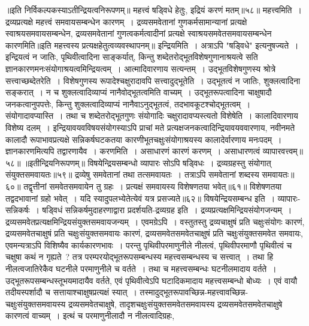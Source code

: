 ॥इति निर्विकल्पकस्याऽतीन्द्रियत्वनिरूपणम्॥
महत्त्वं षड्विधे हेतुः, इद्रियं करणं मतम्॥५८॥
महत्त्वमिति~। द्रव्यप्रत्यक्षे महत्त्वं समवायसम्बन्धेन कारणम्~। द्रव्यसमवेतानां गुणकर्मसामान्यानां प्रत्यक्षे स्वाश्रयसमवायसम्बन्धेन, द्रव्यसमवेतानां गुणत्वकर्मत्वादीनां
प्रत्यक्षे स्वाश्रयसमवेतसमवायसम्बन्धेन कारणमिति॥इति महत्त्वस्य प्रत्यक्षहेतुत्वव्यवस्थापनम्॥
इन्द्रियमिति~। अत्राऽपि "षड्विधे" इत्यनुषज्यते~। इन्द्रियत्वं न जातिः, पृथिवीत्वादिना साङ्कर्यात्, किन्तु शब्देतरोद्भूतविशेषगुणानाश्रयत्वे सति
ज्ञानकारणमनःसंयोगाश्रयत्वमिन्द्रियत्वम्~। आत्मादिवारणाय सत्यन्तम्~। उद्भूतविशेषगुणस्य श्रोत्रे सत्त्वाच्छब्देतरेति~। विशेषगुणस्य रूपादेश्चक्षुरादावपि सत्त्वादुद्भूतेति~।
उद्भूतत्वं न जातिः, शुक्लत्वादिना सङ्करात्~। न च शुक्लत्वादिव्याप्यं नानैवोद्भूतत्वमिति वाच्यम्~। उद्भूतरूपत्वादिना चाक्षुषादौ जनकत्वानुपपत्तेः, किन्तु शुक्लत्वादिव्याप्यं
नानैवाऽनुद्भूतत्वं, तदभावकूटश्चोद्भूतत्वम्~। संयोगादावप्यास्ति~। तथा च शब्देतरोद्भूतगुणः संयोगादिः चक्षुरादावप्यस्त्यतो विशेषेति~। कालादिवारणाय विशेष्य दलम्~।
इन्द्रियावयवविषयसंयोगस्याऽपि प्राचां मते प्रत्यक्षजनकत्वादिन्द्रियावयववारणाय, नवीनमते कालादौ रूपाभावप्रत्यक्षे सन्निकर्षघटकतया कारणीभूतचक्षुःसंयोगाश्रयस्य
कालादेर्वारणाय मनःपदम्~। ज्ञानकारणमित्यपि तद्वारणायैव~। करणमिति~। असाधारणं कारणं करणम्~। असाधारणत्वं व्यापारवत्त्वम्॥५८॥
॥इतीन्द्रियनिरूपणम्॥
विषयेन्द्रियसम्बन्धो व्यापारः सोऽपि षड्विधः~।
द्रव्यग्रहस्तु संयोगात् संयुक्तसमवायतः॥५९॥
द्रव्येषु समवेतानां तथा तत्समवायतः~।
तत्राऽपि समवेतानां शब्दस्य समवायतः॥६०॥
तद्वृत्तीनां समवेतसमवायेन तु ग्रहः~।
प्रत्यक्षं समवायस्य विशेषणतया भवेत्॥६१॥
विशेषणतया तद्वदभावानां ग्रहो भवेत्~।
यदि स्यादुपलभ्येतेत्येवं यत्र प्रसज्यते॥६२॥
विषयेन्द्रियसम्बन्ध इति~। व्यापारः-सन्निकर्षः~।
षड्विधं सन्निकर्षमुदाहरणाद्वारा प्रदर्शयति-द्रव्यग्रह इति~। द्रव्यप्रत्यक्षमिन्द्रियसंयोगजन्यम्~। द्रव्यसमवेतप्रत्यक्षमिन्द्रियसंयुक्तसमवायजन्यम्~। एवमग्रेऽपि~।
वस्तुतस्तु द्रव्यचाक्षुषं प्रति चक्षुःसंयोगः कारणं, द्रव्यसमवेतचाक्षुषं प्रति चक्षुःसंयुक्तसमवायः कारणं, द्रव्यसमवेतसमवेतचाक्षुषं प्रति चक्षुःसंयुक्तसमवेत
समवायः, एवमन्यत्राऽपि विशिष्यैव कार्यकारणभावः~। परन्तु पृथिवीपरमाणुनीले नीलत्वं, पृथिवीपरमाणौ पृथिवीत्वं च चक्षुषा कथं न गृह्यते~? तत्र परम्परयोद्भूतरूपसम्बन्धस्य
महत्त्वसम्बन्धस्य च सत्त्वात्~। तथा हि नीलत्वजातिरेकैव घटनीले परमाणुनीले च वर्तते~। तथा च महत्त्वसम्बन्धः घटनीलमादाय वर्तते~। उद्भूतरूपसम्बन्धस्तूभयमादायैव
वर्तते, एवं पृथिवीत्वेऽपि घटादिकमादाय महत्त्वसम्बन्धो बोध्यः~। एवं वायौ तदीयस्पर्शादौ च सत्तायाश्चाक्षुषप्रत्यक्षं स्यात्~। तस्मादुद्भूतरूपावच्छिन्न-महत्त्वावच्छिन्न-
चक्षुःसंयुक्तसमवायस्य द्रव्यसमवेतचाक्षुषे, तादृशचक्षुःसंयुक्तसमवेतसमवायस्य द्रव्यसमवेतसमवेतचाक्षुषे कारणत्वं वाच्यम्~। इत्थं च परमाणुनीलादौ न नीलत्वादिग्रहः,
